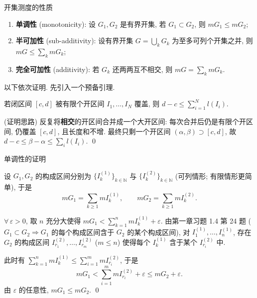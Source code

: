 \begin{frame}{开集测度的性质}

\begin{thm}[开集测度的性质]
\begin{enumerate}
\item \textbf{单调性} (monotonicity): 设 $G_1, G_2$ 是有界开集, 若 $G_1 \subset G_2$, 则 $m G_1 \leqslant m G_2$;
\item \textbf{半可加性} (sub-additivity): 设有界开集 $G = \bigcup_k G_k$ 为至多可列个开集之并, 则
$m G \leqslant \sum_k m G_k$;
\item \textbf{完全可加性} (additivity): 若 $G_k$ 还两两互不相交, 则 $m G = \sum_k m G_k$.
\end{enumerate}
\end{thm}

\pause

以下依次证明. 先引入一个预备引理.

\begin{lem}[长度覆盖引理]
若闭区间 $[c,d]$ 被有限个开区间 $I_1, \ldots, I_N$ 覆盖, 则 $d - c \leqslant \sum_{i=1}^N l(I_i)$.
\end{lem}

\startproof[bg=yellow, fg=red](证明思路)
反复将\textbf{相交}的开区间合并成一个大开区间: 每次合并后仍是有限个开区间, 仍覆盖 $[c,d]$, 且长度和不增. 最终只剩一个开区间 $(\alpha, \beta) \supset [c,d]$, 故 $d - c \leqslant \beta - \alpha \leqslant \sum_i l(I_i)$.
\qed

\end{frame}


\begin{frame}{单调性的证明}

设 $G_1, G_2$ 的构成区间分别为 $\{I_k^{(1)}\}_{k \in \mathbb{N}}$ 与 $\{I_k^{(2)}\}_{k \in \mathbb{N}}$ (可列情形; 有限情形更简单), 于是
\[
m G_1 = \sum_{k \geqslant 1} m I_k^{(1)}, \qquad m G_2 = \sum_{k \geqslant 1} m I_k^{(2)}.
\]

\pause

$\forall\, \varepsilon > 0$, 取 $n$ 充分大使得 $m G_1 < \sum_{k=1}^n m I_k^{(1)} + \varepsilon$. 由第一章习题 1.4 第 24 题 ($G_1 \subset G_2 \Rightarrow G_1$ 的每个构成区间含于 $G_2$ 的某个构成区间), 对 $I_1^{(1)}, \ldots, I_n^{(1)}$, 存在 $G_2$ 的构成区间 $I_{r_1}^{(2)}, \ldots, I_{r_m}^{(2)}$ ($m \leqslant n$) 使得每个 $I_k^{(1)}$ 含于某个 $I_{r_i}^{(2)}$ 中.

\pause

此时有 $\sum_{k=1}^n m I_k^{(1)} \leqslant \sum_{i=1}^m m I_{r_i}^{(2)}$, 于是
\[
m G_1 < \sum_{i=1}^m m I_{r_i}^{(2)} + \varepsilon \leqslant m G_2 + \varepsilon.
\]
由 $\varepsilon$ 的任意性, $m G_1 \leqslant m G_2$.
\qed

\end{frame}

